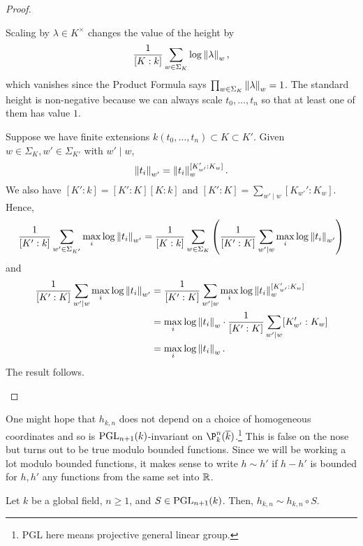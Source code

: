 \documentclass[11pt]{article}
\begin{document}
\begin{proof}
\begin{enum}{\arabic}
\item Scaling by $\lambda\in K^{\times}$ changes the value of the height by 
$$\dfrac{1}{[K:k]}\sum_{w\in\Sigma_K}\log\left\lVert\lambda\right\rVert_w,$$
which vanishes since the Product Formula says $\prod_{w\in\Sigma_K}\left\lVert\lambda\right\rVert_w=1$. The standard height is non-negative because we can always scale $t_0,\ldots,t_n$ so that at least one of them has value $1$.

\item Suppose we have finite extensions $k(t_0,\ldots,t_n)\subset K\subset K'$. Given $w\in\Sigma_K,w'\in\Sigma_{K'}$ with $w'\mid w$, 
$$\left\lVert t_i\right\rVert_{w'}=\left\lVert t_i\right\rVert_w^{[K_{w'}':K_w]}.$$
We also have $[K':k]=[K':K][K:k]$ and $[K':K]=\sum_{w'\mid w}[K_{w'}':K_w]$. Hence,
\begin{align*}
\dfrac{1}{[K':k]}\sum_{w'\in\Sigma_{K'}}\max_i\log\left\lVert t_i\right\rVert_{w'}
=\dfrac{1}{[K:k]}\sum_{w\in\Sigma_K}\left(\dfrac{1}{[K':K]}\sum_{w'\mid w}\max_i\log\left\lVert t_i\right\rVert_{w'}\right)
\end{align*}
and
\begin{align*}
\dfrac{1}{[K':K]}\sum_{w'\mid w}\max_i\log\left\lVert t_i\right\rVert_{w'}
&=\dfrac{1}{[K':K]}\sum_{w'\mid w}\max_i\log\left\lVert t_i\right\rVert_w^{[K_{w'}':K_w]} \\
&=\max_i\log\left\lVert t_i\right\rVert_w\cdot\dfrac{1}{[K':K]}\sum_{w'\mid w}[K_{w'}':K_w] \\
&=\max_i\log\left\lVert t_i\right\rVert_w.
\end{align*}
The result follows. \qedhere
\end{enum}
\end{proof}

One might hope that $h_{k,n}$ does not depend on a choice of homogeneous coordinates and so is $\textup{PGL}_{n+1}(k)$-invariant on $\P_k^n(\ov{k})$.\footnote{PGL here means projective general linear group.} This is false on the nose but turns out to be true modulo bounded functions. Since we will be working a lot modulo bounded functions, it makes sense to write $h\sim h'$ if $h-h'$ is bounded for $h,h'$ any functions from the same set into $\mathbb{R}$.

\begin{lemma}\label{PGL_invariance}
Let $k$ be a global field, $n\geq1$, and $S\in\textup{PGL}_{n+1}(k)$. Then, $h_{k,n}\sim h_{k,n}\circ S$.
\end{lemma}
\end{document}
